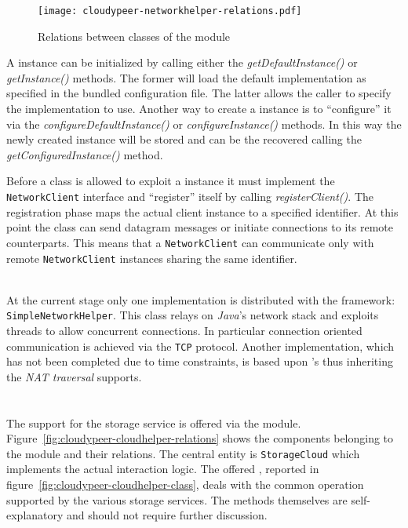 \begin{figure}[h!]
  \centering
  \texttt{[image: cloudypeer-networkhelper-relations.pdf]}
  \caption{Relations between classes of the \networkhelper module}
  \label{fig:cloudypeer-nethelper-relations}
\end{figure}

A \networkhelper instance can be initialized by calling either the
\textit{getDefaultInstance()} or \textit{getInstance()} methods. The former
will load the default implementation as specified in the bundled
configuration file. The latter allows the caller to specify the
implementation to use. Another way to create a \networkhelper instance
is to ``configure'' it via the \textit{configureDefaultInstance()} or
\textit{configureInstance()} methods. In this way the newly created
instance will be stored and can be the recovered calling the
\textit{getConfiguredInstance()} method.

Before a class is allowed to exploit a \networkhelper instance it must
implement the \texttt{NetworkClient} interface and
``register'' itself by calling \textit{registerClient()}. The
registration phase maps the actual client instance to a specified
identifier. At this point the class can send datagram messages or
initiate connections to its remote counterparts. This means that a
\texttt{NetworkClient} can communicate only with remote
\texttt{NetworkClient} instances sharing the same identifier.

\ \\
At the current stage only one \networkhelper implementation is
distributed with the framework: \texttt{SimpleNetworkHelper}. This class
relays on \emph{Java}'s network stack and exploits threads to allow
concurrent connections. In particular connection oriented
communication is achieved via the \texttt{TCP} protocol.
Another implementation, which has not been completed due to time
constraints, is based upon \grapes's \networkhelper thus inheriting
the \emph{NAT traversal} supports.

\section{\cloudhelper}
The support for the \cloud storage service is offered via the
\cloudhelper module. Figure~\ref{fig:cloudypeer-cloudhelper-relations}
shows the components belonging to the module and their relations.
The central entity is \texttt{StorageCloud} which
implements the actual \cloud interaction logic. The offered \api, reported
in figure~\ref{fig:cloudypeer-cloudhelper-class}, deals with the
common operation supported by the various storage services. The
methods themselves are self-explanatory and should not require further
discussion.

